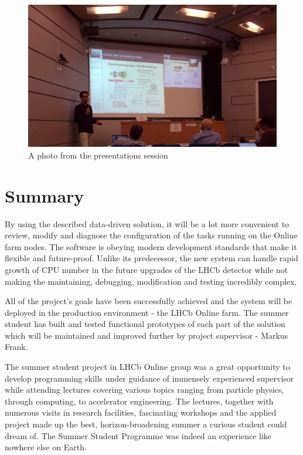\documentclass{customization}
\begin{document}
\begin{figure}[H]
\centering
    \includegraphics[scale=0.4]{images/Project_Presentation.jpg}
    \caption{A photo from the presentations session}
    \label{fig:presentation}
\end{figure}


\newpage
\section{Summary}
\hspace{0.6cm}


By using the described data-driven solution, it will be a lot more convenient to review, modify and diagnose the configuration of the tasks running on the Online farm nodes. The software is obeying modern development standards that make it flexible and future-proof. 
Unlike its predecessor, the new system can handle rapid growth of CPU number in the future upgrades of the LHCb detector while not making the maintaining, debugging, modification and testing incredibly complex.
\newline

\noindent
All of the project's goals have been successfully achieved and the system will be deployed in the production environment - the LHCb Online farm. The summer student has built and tested functional prototypes of each part of the solution which will be maintained and improved further by project supervisor - Markus Frank. 
\newline

\noindent
The summer student project in LHCb Online group was a great opportunity to develop programming skills under guidance of immensely experienced supervisor while attending lectures covering various topics ranging from particle physics, through computing, to accelerator engineering. The lectures, together with numerous visits in research facilities, fascinating workshops and the applied project made up the best, horizon-broadening summer a curious student could dream of. 
\newline  \newline
The Summer Student Programme was indeed an experience like nowhere else on Earth.
\vspace{3cm}
\end{document}
